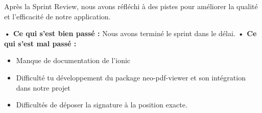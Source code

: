 Après la Sprint Review, nous avons réfléchi à des pistes pour améliorer la qualité et l'efficacité de notre application.


\noindent\textbf{•	Ce qui s'est bien passé :}
Nous avons terminé le sprint dans le délai.
\noindent\textbf{•	Ce qui s'est mal passé :}
\begin{itemize}
  \item Manque de documentation de l'ionic
  \item Difficulté tu développement du package neo-pdf-viewer et son intégration dans notre projet
  \item Difficultés de déposer la signature à la position exacte.
\end{itemize}

